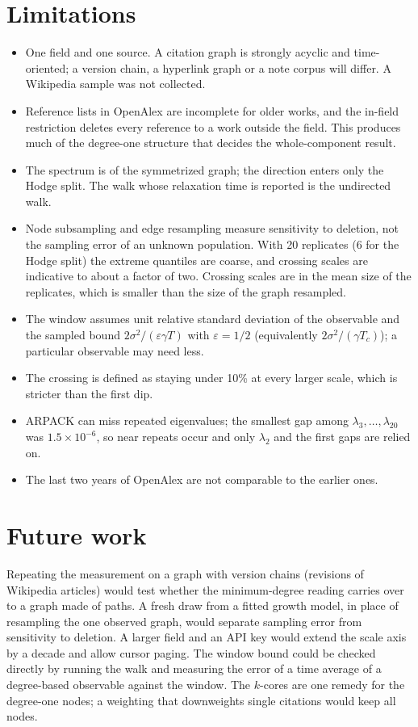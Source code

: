 \documentclass[11pt]{article}
\begin{document}
\section{Limitations}
\begin{itemize}
  \item One field and one source. A citation graph is strongly acyclic and time-oriented; a version
  chain, a hyperlink graph or a note corpus will differ. A Wikipedia sample was not collected.
  \item Reference lists in OpenAlex are incomplete for older works, and the in-field restriction
  deletes every reference to a work outside the field. This produces much of the degree-one structure
  that decides the whole-component result.
  \item The spectrum is of the symmetrized graph; the direction enters only the Hodge split. The
  walk whose relaxation time is reported is the undirected walk.
  \item Node subsampling and edge resampling measure sensitivity to deletion, not the sampling error
  of an unknown population. With 20 replicates (6 for the Hodge split) the extreme quantiles are
  coarse, and crossing scales are indicative to about a factor of two. Crossing scales are in the mean
  size of the replicates, which is smaller than the size of the graph resampled.
  \item The window assumes unit relative standard deviation of the observable and the sampled
  bound $2\sigma^2/(\varepsilon\gamma T)$ with $\varepsilon = 1/2$ (equivalently $2\sigma^2/(\gamma T_c)$); a particular observable may need less.
  \item The crossing is defined as staying under 10\% at every larger scale, which is stricter than
  the first dip.
  \item ARPACK can miss repeated eigenvalues; the smallest gap among $\lambda_3,\dots,\lambda_{20}$ was
  $1.5\times 10^{-6}$, so near repeats occur and only $\lambda_2$ and the first gaps are relied on.
  \item The last two years of OpenAlex are not comparable to the earlier ones.
\end{itemize}

\section{Future work}
Repeating the measurement on a graph with version chains (revisions of Wikipedia articles) would test
whether the minimum-degree reading carries over to a graph made of paths. A fresh draw
from a fitted growth model, in place of resampling the one observed graph, would separate sampling
error from sensitivity to deletion. A larger field and an API key would extend the scale axis by a
decade and allow cursor paging. The window bound could be checked directly by running the walk
and measuring the error of a time average of a degree-based observable against the window. The
$k$-cores are one remedy for the degree-one nodes; a weighting that downweights single citations
would keep all nodes.
\end{document}
